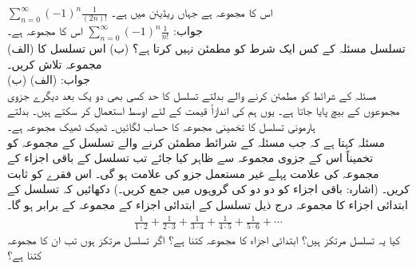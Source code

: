 $\sum\limits_{n=0}^{\infty}(-1)^n\frac{1}{(2n)!}$\quad
اس کا مجموعہ  ہے جہاں  ریڈیئن میں ہے۔\\
جواب:\quad
{}
$\sum\limits_{n=0}^{\infty}(-1)^n\frac{1}{n!}$\quad
اس کا مجموعہ  ہے۔ 
\\
(الف) تسلسل  مسئلہ  کے کس ایک شرط کو مطمئن نہیں کرتا ہے؟ (ب) اس تسلسل کا مجموعہ تلاش کریں۔\\
جواب:\quad
(الف)  (ب) 
\\
مسئلہ  کے شرائط کو مطمئن کرنے والے بدلتے تسلسل کا حد  کسی بھی دو یک بعد دیگرے جزوی مجموعوں کے بیچ پایا جاتا ہے۔ یوں ہم  کی اندازاً قیمت کے لئے اوسط  استعمال کر سکتے ہیں۔ بدلتے ہارمونی تسلسل کا تخمینی مجموعہ  کا حساب لگائیں۔ ٹھیک ٹھیک مجموعہ  ہے۔
\\
مسئلہ  کہتا ہے کہ جب مسئلہ  کے شرائط مطمئن کرنے والے تسلسل  کے مجموعہ کو تخمیناً اس کے جزوی مجموعہ سے ظاہر کیا جائے تب تسلسل کے باقی اجزاء کے مجموعہ کی علامت پہلے غیر مستعمل جزو کی علامت ہو گی۔ اس فقرے کو ثابت کریں۔ (اشارہ: باقی اجزاء کو دو دو کی گروہوں میں جمع کریں۔)
دکھائیں کہ تسلسل  کے ابتدائی  اجزاء کا مجموعہ درج ذیل تسلسل کے ابتدائی  اجزاء کے مجموعہ کے برابر ہو گا۔
\begin{align*}
\frac{1}{1\cdot 2}+\frac{1}{2\cdot 3}+\frac{1}{3\cdot 4}+\frac{1}{4\cdot 5}+\frac{1}{5\cdot 6}+\cdots
\end{align*}
کیا یہ تسلسل مرتکز ہیں؟ ابتدائی  اجزاء کا مجموعہ کتنا ہے؟ اگر تسلسل مرتکز ہوں تب ان کا مجموعہ کتنا ہے؟
